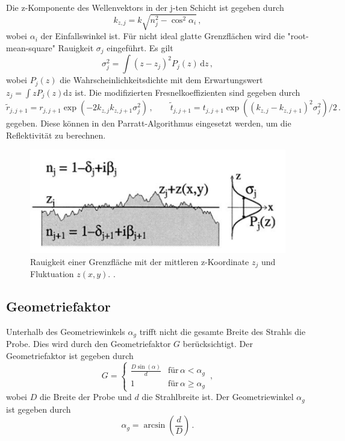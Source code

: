 Die z-Komponente des Wellenvektors in der j-ten Schicht ist gegeben durch
\begin{equation}
    k_{z,j} = k \sqrt{n_j^2 - \cos^2\alpha_i} \, ,
\end{equation}
wobei $\alpha_i$ der Einfallswinkel ist.
Für nicht ideal glatte Grenzflächen wird die "root-mean-square" Rauigkeit $\sigma_j$ eingeführt.
Es gilt
\begin{equation}
   \sigma_j^2 = \int (z-z_j)^2 P_j(z) \, \text{d}z \, ,
\end{equation}
wobei $P_j(z)$ die Wahrscheinlichkeitsdichte mit dem Erwartungswert $z_j = \int z P_j(z)\text{d}z$ ist.
Die modifizierten Fresnelkoeffizienten sind gegeben durch
\begin{equation}
    \tilde{r}_{j,j+1} = r_{j,j+1} \exp{(-2 k_{z,j} k_{z,j+1} \sigma_j^2)} \, , \qquad \tilde{t}_{j,j+1} = t_{j,j+1} \exp{((k_{z,j} - k_{z,j+1})^2 \sigma_j^2)/2} \, .
\end{equation}
gegeben. Diese können in den Parratt-Algorithmus eingesetzt werden, um die Reflektivität zu berechnen.

\begin{figure}
    \centering
    \includegraphics[scale=0.5]{Bilder/sigma.png}
    \caption{Rauigkeit einer Grenzfläche mit der mittleren z-Koordinate $z_j$ und Fluktuation $z(x,y)$. \cite{m-tolan2013}.}
    \label{fig:rauigkeit}
\end{figure}


\subsection{Geometriefaktor} \label{sec:Geometriefaktor}
Unterhalb des Geometriewinkels $\alpha_g$ trifft nicht die gesamte Breite des Strahls die Probe.
Dies wird durch den Geometriefaktor $G$ berücksichtigt.
Der Geometriefaktor ist gegeben durch
\begin{equation}\label{eq:geometriefaktor}
    G = \begin{cases}
        \frac{D \sin(\alpha)}{d} & \text{für} \, \alpha < \alpha_g \\
        1 & \text{für} \, \alpha \geq \alpha_g
    \end{cases} \, ,
\end{equation}
wobei $D$ die Breite der Probe und $d$ die Strahlbreite ist.
Der Geometriewinkel $\alpha_g$ ist gegeben durch
\begin{equation}\label{eq:geometriewinkel}
    \alpha_g = \arcsin \left( \frac{d}{D} \right) \, .
\end{equation}
